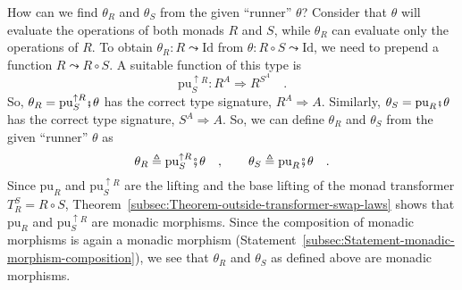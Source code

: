 How can we find $\theta_{R}$ and $\theta_{S}$ from the given ``runner''
$\theta$? Consider that $\theta$ will evaluate the operations of
both monads $R$ and $S$, while $\theta_{R}$ can evaluate only the
operations of $R$. To obtain $\theta_{R}:R\leadsto\text{Id}$ from
$\theta:R\circ S\leadsto\text{Id}$, we need to prepend a function
$R\leadsto R\circ S$. A suitable function of this type is 
\[
\text{pu}_{S}^{\uparrow R}:R^{A}\Rightarrow R^{S^{A}}\quad.
\]
So, $\theta_{R}=\text{pu}_{S}^{\uparrow R}\bef\theta$ has the correct
type signature, $R^{A}\Rightarrow A$. Similarly, $\theta_{S}=\text{pu}_{R}\bef\theta$
has the correct type signature, $S^{A}\Rightarrow A$. So, we can
define $\theta_{R}$ and $\theta_{S}$ from the given ``runner''
$\theta$ as
\[
\theta_{R}\triangleq\text{pu}_{S}^{\uparrow R}\bef\theta\quad,\quad\quad\theta_{S}\triangleq\text{pu}_{R}\bef\theta\quad.
\]
Since $\text{pu}_{R}$ and $\text{pu}_{S}^{\uparrow R}$ are the lifting
and the base lifting of the monad transformer $T_{R}^{S}=R\circ S$,
Theorem~\ref{subsec:Theorem-outside-transformer-swap-laws} shows
that $\text{pu}_{R}$ and $\text{pu}_{S}^{\uparrow R}$ are monadic
morphisms. Since the composition of monadic morphisms is again a monadic
morphism (Statement~\ref{subsec:Statement-monadic-morphism-composition}),
we see that $\theta_{R}$ and $\theta_{S}$ as defined above are monadic
morphisms.

